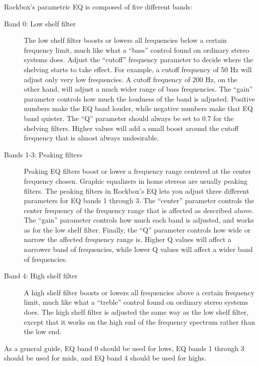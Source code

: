 {  Rockbox's parametric EQ is composed of five different bands:
  \begin{description}
  \item[Band 0: Low shelf filter]
        The low shelf filter boosts or lowers all frequencies below a certain
        frequency limit, much like what a ``bass'' control found on ordinary
        stereo systems does.
        Adjust the ``cutoff'' frequency parameter to decide where the shelving
        starts to take effect. For example, a cutoff frequency of 50 Hz will
        adjust only very low frequencies. A cutoff frequency of 200 Hz, on the
        other hand, will adjust a much wider range of bass frequencies.
        The ``gain'' parameter controls how much the loudness of the band is
        adjusted. Positive numbers make the EQ band louder, while negative
        numbers make that EQ band quieter.
        The ``Q'' parameter should always be set to 0.7 for the shelving
        filters. Higher values will add a small boost around the cutoff
        frequency that is almost always undesirable.
  \item[Bands 1-3: Peaking filters]
        Peaking EQ filters boost or lower a frequency range centered at the
        center frequency chosen.
        Graphic equalizers in home stereos are usually peaking
        filters. The peaking filters in Rockbox's EQ lets you adjust three
        different parameters for EQ bands 1 through 3. The ``center'' parameter
        controls the center frequency of the frequency range that is affected
        as described above.
        The ``gain'' parameter controls how much each band is adjusted, and
        works as for the low shelf filter.
        Finally, the ``Q'' parameter controls how wide or narrow the affected
        frequency range is. Higher Q values will affect a narrower band of
        frequencies, while lower Q values will affect a wider band of
        frequencies.
  \item[Band 4: High shelf filter]
        A high shelf filter boosts or lowers all frequencies above a certain
        frequency limit, much like what a ``treble'' control found on ordinary
        stereo systems does.
        The high shelf filter is adjusted the same way as the low shelf filter,
        except that it works on the high end of the frequency spectrum rather
        than the low end.
  \end{description}
  As a general guide, EQ band 0 should be used for lows, EQ bands 1
  through 3 should be used for mids, and EQ band 4 should be used for highs.

}
